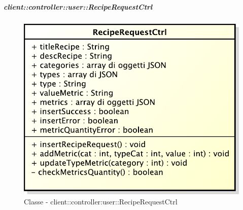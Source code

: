 		\subparagraph{client::controller::user::RecipeRequestCtrl} %
		\label{subp:client_controller_user_reciperequestctrl}
			\begin{figure}[htbp]
				\centering
				\centerline{\includegraphics[scale=0.7]{./images/client/classes/controller/recipe_request_ctrl.pdf}}
				\caption{Classe - client::controller:user::RecipeRequestCtrl}
			\end{figure}
